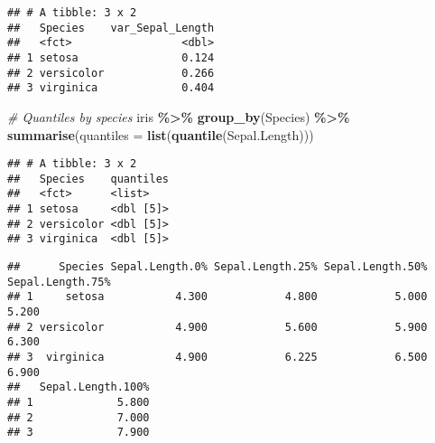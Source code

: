 \documentclass[
]{article}
\newenvironment{Shaded}{\begin{snugshade}}{\end{snugshade}}
\newcommand{\AttributeTok}[1]{\textcolor[rgb]{0.13,0.29,0.53}{#1}}
\newcommand{\CommentTok}[1]{\textcolor[rgb]{0.56,0.35,0.01}{\textit{#1}}}
\newcommand{\DecValTok}[1]{\textcolor[rgb]{0.00,0.00,0.81}{#1}}
\newcommand{\FunctionTok}[1]{\textcolor[rgb]{0.13,0.29,0.53}{\textbf{#1}}}
\newcommand{\NormalTok}[1]{#1}
\newcommand{\SpecialCharTok}[1]{\textcolor[rgb]{0.81,0.36,0.00}{\textbf{#1}}}
\newcommand{\StringTok}[1]{\textcolor[rgb]{0.31,0.60,0.02}{#1}}
\begin{document}
\begin{verbatim}
## # A tibble: 3 x 2
##   Species    var_Sepal_Length
##   <fct>                 <dbl>
## 1 setosa                0.124
## 2 versicolor            0.266
## 3 virginica             0.404
\end{verbatim}

\begin{Shaded}
\begin{Highlighting}[]
\CommentTok{\# Quantiles by species}
\NormalTok{iris }\SpecialCharTok{\%\textgreater{}\%}
   \FunctionTok{group\_by}\NormalTok{(Species) }\SpecialCharTok{\%\textgreater{}\%}
   \FunctionTok{summarise}\NormalTok{(}\AttributeTok{quantiles =} \FunctionTok{list}\NormalTok{(}\FunctionTok{quantile}\NormalTok{(Sepal.Length)))}
\end{Highlighting}
\end{Shaded}

\begin{verbatim}
## # A tibble: 3 x 2
##   Species    quantiles
##   <fct>      <list>   
## 1 setosa     <dbl [5]>
## 2 versicolor <dbl [5]>
## 3 virginica  <dbl [5]>
\end{verbatim}

\begin{Shaded}
\end{Shaded}

\begin{verbatim}
##      Species Sepal.Length.0% Sepal.Length.25% Sepal.Length.50% Sepal.Length.75%
## 1     setosa           4.300            4.800            5.000            5.200
## 2 versicolor           4.900            5.600            5.900            6.300
## 3  virginica           4.900            6.225            6.500            6.900
##   Sepal.Length.100%
## 1             5.800
## 2             7.000
## 3             7.900
\end{verbatim}

\begin{Shaded}
\end{Shaded}
\end{document}
